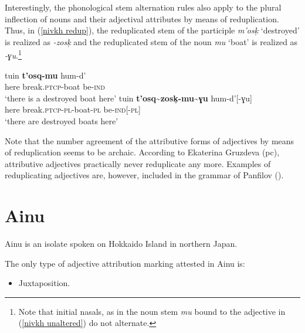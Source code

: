 Interestingly, the phonological stem alternation rules also apply to the plural inflection of nouns and their adjectival attributes by means of reduplication. Thus, in (\ref{nivkh redup}), the reduplicated stem of the participle \textit{m'osk̦} ‘destroyed’ is realized as \textit{-zosk̦} and the reduplicated stem of the noun \textit{mu} ‘boat’ is realized as \textit{-ɣu}.\footnote{Note that initial nasals, as in the noun stem \textit{mu} bound to the adjective in (\ref{nivkh unaltered}) do not alternate.}
\begin{exe}
\ex \label{nivkh redup} 
\begin{xlist}
\ex 
\gll	tuin \textbf{t'osq-mu} hum-d'\\
	here break.\textsc{ptcp}-boat be-\textsc{ind}\\
\glt	‘there is a destroyed boat here’ 
\ex	\label{nivkh unaltered}
\gll	tuin \textbf{t'osq\textasciitilde zosk̦-mu\textasciitilde ɣu} hum-d'[-ɣu]\\
	here break.\textsc{ptcp}-\textsc{pl}-boat-\textsc{pl} be-\textsc{ind}[-\textsc{pl}]\\
\glt	‘there are destroyed boats here’
\end{xlist}
\end{exe}
Note that the number agreement of the attributive forms of adjectives by means of reduplication seems to be archaic. According to Ekaterina Gruzdeva (pc), attributive adjectives practically never reduplicate any more. Examples of reduplicating adjectives are, however, included in the grammar of Panfilov (\citeyear{panfilov1965}).

\section{Ainu}
Ainu is an isolate spoken on Hokkaido Island in northern Japan.

The only type of adjective attribution marking attested in Ainu is:
\begin{itemize}
\item Juxtaposition.
\end{itemize}

